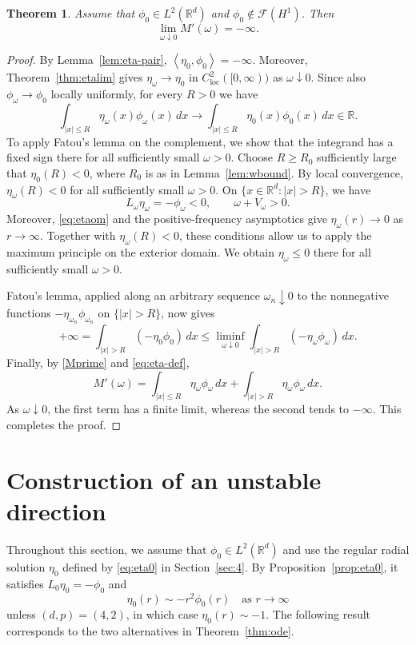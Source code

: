 \documentclass[12pt, a4paper, reqno]{amsart}
\numberwithin{equation}{section}
\newtheorem{theorem}{Theorem}[section]
\theoremstyle{definition}
\theoremstyle{remark}
\newcommand{\R}{\mathbb R}
\newcommand{\cF}{\mathcal F}
\def\tbra[#1,#2]{{\left\langle #1,#2\right\rangle}}
\begin{document}
\begin{theorem}
\label{thm:massdiv}
Assume that $\phi_0\in L^2(\R^d)$ and
$\phi_0\notin\cF(H^1)$.
Then
\[
  \lim_{\omega\downarrow0}M'(\omega)=-\infty.
\]
\end{theorem}

\begin{proof}
By Lemma~\ref{lem:eta-pair},
$\tbra[\eta_0,\phi_0]=-\infty$.
Moreover, Theorem~\ref{thm:etalim} gives
$\eta_\omega\to\eta_0$ in $C_{\mathrm{loc}}^2([0,\infty))$ as
$\omega\downarrow0$. Since also $\phi_\omega\to\phi_0$ locally
uniformly, for every $R>0$ we have
\[
  \int_{|x|\le R}\eta_\omega(x)\phi_\omega(x)\,dx
  \to
  \int_{|x|\le R}\eta_0(x)\phi_0(x)\,dx\in\R.
\]
To apply Fatou's lemma on the complement, we show that the integrand
has a fixed sign there for all sufficiently small $\omega>0$. Choose $R\ge R_0$ sufficiently large that
$\eta_0(R)<0$, where $R_0$ is as in Lemma~\ref{lem:wbound}.
By local convergence, $\eta_\omega(R)<0$ for all sufficiently small
$\omega>0$. On $\{x\in\R^d:|x|>R\}$, we have
\[
  L_\omega\eta_\omega=-\phi_\omega<0,
  \qquad \omega+V_\omega>0.
\]
Moreover, \eqref{eq:etaom} and the positive-frequency asymptotics
give $\eta_\omega(r)\to0$ as $r\to\infty$.
Together with $\eta_\omega(R)<0$, these conditions allow us to
apply the maximum principle on the exterior domain. We obtain
$\eta_\omega\le0$ there for all sufficiently small $\omega>0$.

Fatou's lemma, applied along an arbitrary sequence
$\omega_n\downarrow0$ to the nonnegative functions
$-\eta_{\omega_n}\phi_{\omega_n}$ on $\{|x|>R\}$, now gives
\[
  +\infty
  =\int_{|x|>R}(-\eta_0\phi_0)\,dx
  \le\liminf_{\omega\downarrow0}
       \int_{|x|>R}(-\eta_\omega\phi_\omega)\,dx.
\]
Finally, by \eqref{Mprime} and \eqref{eq:eta-def},
\[
  M'(\omega)
  =\int_{|x|\le R}\eta_\omega\phi_\omega\,dx
   +\int_{|x|>R}\eta_\omega\phi_\omega\,dx.
\]
As $\omega\downarrow0$, the first term has a finite limit, whereas
the second tends to $-\infty$. This completes the proof.
\end{proof}


\section{Construction of an unstable direction}
\label{sec:dir}

Throughout this section, we assume that $\phi_0\in L^2(\R^d)$ and use
the regular radial solution $\eta_0$ defined by \eqref{eq:eta0} in
Section~\ref{sec:4}. By Proposition~\ref{prop:eta0}, it satisfies
$L_0\eta_0=-\phi_0$ and
\[
  \eta_0(r)\sim-r^2\phi_0(r)
  \quad\text{as }r\to\infty
\]
unless $(d,p)=(4,2)$, in which case $\eta_0(r)\sim-1$.
The following result corresponds to the two alternatives in
Theorem~\ref{thm:ode}.
\end{document}
